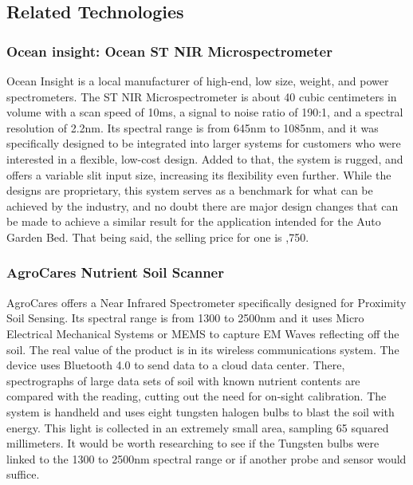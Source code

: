 \subsection{Related Technologies}

\subsubsection{Ocean insight: Ocean ST NIR Microspectrometer}

Ocean Insight is a local manufacturer of high-end, low size, weight, and power spectrometers. The ST NIR Microspectrometer is about 40 cubic centimeters in volume with a scan speed of 10ms, a signal to noise ratio of 190:1, and a spectral resolution of 2.2nm. Its spectral range is from 645nm to 1085nm, and it was specifically designed to be integrated into larger systems for customers who were interested in a flexible, low-cost design. Added to that, the system is rugged, and offers a variable slit input size, increasing its flexibility even further. While the designs are proprietary, this system serves as a benchmark for what can be achieved by the industry, and no doubt there are major design changes that can be made to achieve a similar result for the application intended for the Auto Garden Bed. That being said, the selling price for one is ,750.

\subsubsection{AgroCares Nutrient Soil Scanner}

AgroCares offers a Near Infrared Spectrometer specifically designed for Proximity Soil Sensing. Its spectral range is from 1300 to 2500nm and it uses Micro Electrical Mechanical Systems or MEMS to capture EM Waves reflecting off the soil. The real value of the product is in its wireless communications system. The device uses Bluetooth 4.0 to send data to a cloud data center. There, spectrographs of large data sets of soil with known nutrient contents are compared with the reading, cutting out the need for on-sight calibration. The system is handheld and uses eight tungsten halogen bulbs to blast the soil with energy. This light is collected in an extremely small area, sampling 65 squared millimeters. It would be worth researching to see if the Tungsten bulbs were linked to the 1300 to 2500nm spectral range or if another probe and sensor would suffice.
